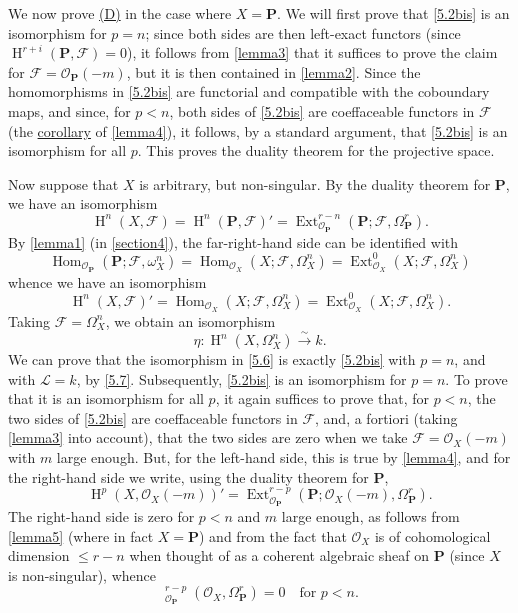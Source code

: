 \documentclass{article}
\theoremstyle{plain}
\theoremstyle{definition}
\newcommand{\sh}{\mathscr}
\newcommand{\bb}{\mathbf}
\renewcommand{\leq}{\leqslant}
\DeclareMathOperator{\Ext}{Ext}
\DeclareMathOperator{\Hom}{Hom}
\DeclareMathOperator{\shExt}{\underline{Ext}}
\DeclareMathOperator{\HH}{H}
\newcommand{\oldpage}[1]{\marginpar{\footnotesize$\Big\vert$ \textit{p.~#1}}}
\begin{document}
We now prove \hyperref[(D)]{(D)} in the case where $X=\bb{P}$.
We will first prove that \cref{5.2bis} is an isomorphism for $p=n$;
since both sides are then left-exact functors (since $\HH^{r+i}(\bb{P},\sh{F})=0$), it follows from \cref{lemma3} that it suffices to prove the claim for $\sh{F}=\sh{O}_\bb{P}(-m)$, but it is then contained in \cref{lemma2}.
Since the homomorphisms in \cref{5.2bis} are functorial and compatible with the coboundary maps, and since, for $p<n$, both sides of \cref{5.2bis} are coeffaceable functors in $\sh{F}$ (the \hyperref[lemma3andlemma4corollary]{corollary} of \cref{lemma4}), it follows, by a standard argument, that \cref{5.2bis} is an isomorphism for all $p$.
This proves the duality theorem for the projective space.

Now suppose that $X$ is arbitrary, but non-singular.
By the duality theorem for $\bb{P}$, we have an isomorphism
\[
  \HH^n(X,\sh{F})
  = \HH^n(\bb{P},\sh{F})'
  = \Ext_{\sh{O}_\bb{P}}^{r-n}(\bb{P};\sh{F},\Omega_\bb{P}^r).
\]
By \cref{lemma1} (in \cref{section4}), the far-right-hand side can be identified with
\[
  \Hom_{\sh{O}_\bb{P}}(\bb{P};\sh{F},\omega_X^n)
  = \Hom_{\sh{O}_X}(X;\sh{F},\Omega_X^n)
  = \Ext_{\sh{O}_X}^0(X;\sh{F},\Omega_X^n)
\]
whence we have an isomorphism
\[
\label{5.6}
  \HH^n(X,\sh{F})'
  = \Hom_{\sh{O}_X}(X;\sh{F},\Omega_X^n)
  = \Ext_{\sh{O}_X}^0(X;\sh{F},\Omega_X^n).
\tag{5.6}
\]
Taking $\sh{F}=\Omega_X^n$, we obtain an isomorphism
\[
\label{5.7}
  \eta\colon \HH^n(X,\Omega_X^n) \xrightarrow{\sim} k.
\tag{5.7}
\]
\oldpage{149-17}
We can prove that the isomorphism in \cref{5.6} is exactly \cref{5.2bis} with $p=n$, and with $\sh{L}=k$, by \cref{5.7}.
Subsequently, \cref{5.2bis} is an isomorphism for $p=n$.
To prove that it is an isomorphism for all $p$, it again suffices to prove that, for $p<n$, the two sides of \cref{5.2bis} are coeffaceable functors in $\sh{F}$, and, a fortiori (taking \cref{lemma3} into account), that the two sides are zero when we take $\sh{F}=\sh{O}_X(-m)$ with $m$ large enough.
But, for the left-hand side, this is true by \cref{lemma4}, and for the right-hand side we write, using the duality theorem for $\bb{P}$,
\[
  \HH^p(X,\sh{O}_X(-m))'
  = \Ext_{\sh{O}_\bb{P}}^{r-p}(\bb{P};\sh{O}_X(-m),\Omega_\bb{P}^r).
\]
The right-hand side is zero for $p<n$ and $m$ large enough, as follows from \cref{lemma5} (where in fact $X=\bb{P}$) and from the fact that $\sh{O}_X$ is of cohomological dimension $\leq r-n$ when thought of as a coherent algebraic sheaf on $\bb{P}$ (since $X$ is non-singular), whence
\[
  \shExt_{\sh{O}_\bb{P}}^{r-p}(\sh{O}_X,\Omega_\bb{P}^r) = 0
  \quad\mbox{for $p<n$.}
\]
\end{document}
